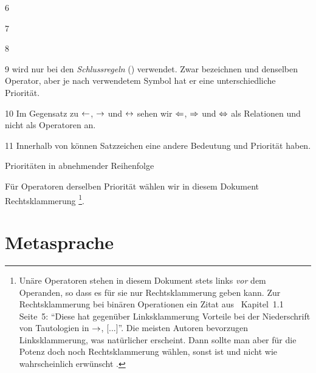 \begin{table}[p]
\begin{center}
\begin{threeparttable}
\begin{tablenotes}
				\item[6] 
				\item[7] 
				\item[8] 
				\item[9] \chrqt{$\srand$} wird nur bei den \emph{Schlussregeln} () verwendet.
				Zwar bezeichnen \chrqt{$\metaandsym$} und \chrqt{$\srand$} denselben Operator, aber je nach verwendetem Symbol hat er eine unterschiedliche Priorität.
				\item[10] Im Gegensatz zu $\leftarrow$, $\rightarrow$ und $\leftrightarrow$ sehen wir $\Leftarrow$, $\Rightarrow$ und $\Leftrightarrow$ als Relationen und nicht als Operatoren an.
				\item[11] Innerhalb von  können Satzzeichen eine andere Bedeutung und Priorität haben.
			\end{tablenotes}
		\end{threeparttable}
		\caption{Prioritäten in abnehmender Reihenfolge}
		\label{tab:Prioritäten}%
	\end{center}
\end{table}

Für Operatoren derselben Priorität wählen wir in diesem Dokument Rechtsklammerung%
\footnote{%
	Unäre Operatoren stehen in diesem Dokument stets links \emph{vor} dem Operanden, so dass es für sie nur Rechtsklammerung geben kann.
	Zur Rechtsklammerung bei binären Operationen ein Zitat aus~\cite{bib:Rautenberg} Kapitel~1.1 Seite~5:
	\enquote{Diese hat gegenüber Linksklammerung Vorteile bei der Niederschrift von Tautologien in $\rightarrow$, [...]}.
	Die meisten Autoren bevorzugen Linksklammerung, was natürlicher erscheint.
	Dann sollte man aber für die Potenz doch noch Rechtsklammerung wählen, sonst ist  und nicht wie wahrscheinlich erwünscht .
}.

\section{Metasprache}%
\label{sec:Metasprache}

